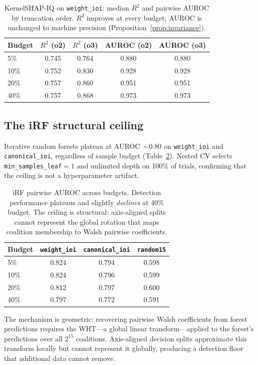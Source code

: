 \documentclass[10pt]{article}
\begin{document}
\begin{table}[t]
\centering
\caption{KernelSHAP-IQ on \texttt{weight\_ioi}: median $R^2$ and
pairwise AUROC by truncation order. $R^2$ improves at every budget;
AUROC is unchanged to machine precision
(Proposition~\ref{prop:invariance}).}
\label{tab:order-effect}
\begin{tabular}{lcccc}
\toprule
Budget & $R^2$ (o2) & $R^2$ (o3) & AUROC (o2) & AUROC (o3) \\
\midrule
5\%  & 0.745 & 0.764 & 0.880 & 0.880 \\
10\% & 0.752 & 0.830 & 0.928 & 0.928 \\
20\% & 0.757 & 0.860 & 0.951 & 0.951 \\
40\% & 0.757 & 0.868 & 0.973 & 0.973 \\
\bottomrule
\end{tabular}
\end{table}


\subsection{The iRF structural ceiling}
\label{sec:irf-ceiling}

Iterative random forests plateau at AUROC~$\sim 0.80$ on
\texttt{weight\_ioi} and \texttt{canonical\_ioi}, regardless of
sample budget (Table~\ref{tab:irf-ceiling}). Nested CV selects
\texttt{min\_samples\_leaf}$=1$ and unlimited depth on 100\% of
trials, confirming that the ceiling is not a hyperparameter artifact.

\begin{table}[t]
\centering
\caption{iRF pairwise AUROC across budgets. Detection performance
plateaus and slightly \emph{declines} at 40\% budget. The ceiling
is structural: axis-aligned splits cannot represent the global
rotation that maps coalition membership to Walsh pairwise coefficients.}
\label{tab:irf-ceiling}
\begin{tabular}{lccc}
\toprule
Budget & \texttt{weight\_ioi} & \texttt{canonical\_ioi} & \texttt{random15} \\
\midrule
5\%  & 0.824 & 0.794 & 0.598 \\
10\% & 0.824 & 0.796 & 0.599 \\
20\% & 0.812 & 0.797 & 0.600 \\
40\% & 0.797 & 0.772 & 0.591 \\
\bottomrule
\end{tabular}
\end{table}

The mechanism is geometric: recovering pairwise Walsh coefficients
from forest predictions requires the WHT---a global linear
transform---applied to the forest's predictions over all $2^{15}$
coalitions. Axis-aligned decision splits approximate this transform
locally but cannot represent it globally, producing a detection floor
that additional data cannot remove.
\end{document}

